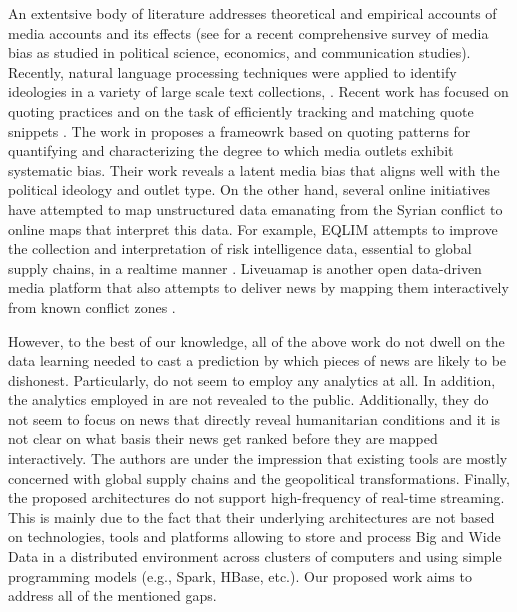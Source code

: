 An extentsive body of literature addresses theoretical and empirical accounts of media accounts and its effects (see \cite{PS13} for a recent comprehensive survey of media bias as studied in political science, economics, and communication studies). Recently, natural language processing techniques were applied to identify ideologies in a variety of large scale text collections, \cite{CR13,IetAl14,JetAl15,LetAl08,NetAl13,SetAl13,VetAl14,WetAl13a,WetAl13b}. Recent work has focused on quoting practices and on the task of efficiently tracking and matching quote snippets \cite{SetAl14, SetAl12}. The work in \cite{NSZML15} proposes a frameowrk based on quoting patterns for quantifying and characterizing the degree to which media outlets exhibit systematic bias. Their work reveals a latent media bias that aligns well with the political ideology and outlet type. On the other hand, several online initiatives have attempted to map unstructured data emanating from the Syrian conflict to online maps that interpret this data. For example, EQLIM attempts to improve the collection and interpretation of risk intelligence data, essential to global supply chains, in a realtime manner \cite{Eqlim}. Liveuamap is another open data-driven media platform that also attempts to deliver news by mapping them interactively from known conflict zones \cite{Isis}. 

However, to the best of our knowledge, all of the above work do not dwell on the data learning needed to cast a prediction by which pieces of news are likely to be dishonest. Particularly, \cite{Isis} do not seem to employ any analytics at all. In addition, the analytics employed in \cite{Eqlim} are not revealed to the public.
%
Additionally, they do not seem to focus on news that directly reveal humanitarian conditions and it is not clear on what basis their news get ranked before they are mapped interactively. The authors are under the impression that existing tools are mostly concerned with global supply chains and the geopolitical transformations. 
%
Finally, the proposed architectures do not support high-frequency of real-time streaming. This is mainly due to the fact that their underlying architectures are not based on technologies, tools and platforms allowing to store and process Big and Wide Data in a distributed environment across clusters of computers and using simple programming models (e.g., Spark, HBase, etc.).
%
Our proposed work aims to address all of the mentioned gaps. 


